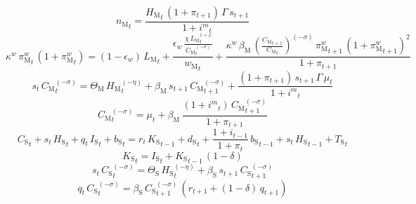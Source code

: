 \begin{dmath}
{n_\mathrm{M}}_{t}=\frac{{H_\mathrm{M}}_{t}\, \left(1+{\pi}_{t+1}\right)\, {\Gamma}\, {s}_{t+1}}{1+{i^m}_{t}}
\end{dmath}
\begin{dmath}
{\kappa^w}\, {\pi^w_\mathrm{M}}_{t}\, \left(1+{\pi^w_\mathrm{M}}_{t}\right)=\left(1-{\epsilon_w}\right)\, {L_\mathrm{M}}_{t}+\frac{{\epsilon_w}\, \frac{{\chi}\, {L_\mathrm{M}}_{t}^{1+{\varphi}}}{{C_\mathrm{M}}_{t}^{\left(-{\sigma}\right)}}}{{w_\mathrm{M}}_{t}}+\frac{{\kappa^w}\, {\beta_\mathrm{M}}\, \left(\frac{{C_\mathrm{M}}_{t+1}}{{C_\mathrm{M}}_{t}}\right)^{\left(-{\sigma}\right)}\, {\pi^w_\mathrm{M}}_{t+1}\, \left(1+{\pi^w_\mathrm{M}}_{t+1}\right)^{2}}{1+{\pi}_{t+1}}
\end{dmath}
\begin{dmath}
{s}_{t}\, {C_\mathrm{M}}_{t}^{\left(-{\sigma}\right)}={\Theta_\mathrm{M}}\, {H_\mathrm{M}}_{t}^{\left(-{\eta}\right)}+{\beta_\mathrm{M}}\, {s}_{t+1}\, {C_\mathrm{M}}_{t+1}^{\left(-{\sigma}\right)}+\frac{\left(1+{\pi}_{t+1}\right)\, {s}_{t+1}\, {\Gamma}\, {\mu}_{t}}{1+{i^m}_{t}}
\end{dmath}
\begin{dmath}
{C_\mathrm{M}}_{t}^{\left(-{\sigma}\right)}={\mu}_{t}+{\beta_\mathrm{M}}\, \frac{\left(1+{i^m}_{t}\right)\, {C_\mathrm{M}}_{t+1}^{\left(-{\sigma}\right)}}{1+{\pi}_{t+1}}
\end{dmath}
\begin{dmath}
{C_\mathrm{S}}_{t}+{s}_{t}\, {H_\mathrm{S}}_{t}+{q}_{t}\, {I_\mathrm{S}}_{t}+{b_\mathrm{S}}_{t}={r}_{t}\, {K_\mathrm{S}}_{t-1}+{d_\mathrm{S}}_{t}+\frac{1+{i}_{t-1}}{1+{\pi}_{t}}\, {b_\mathrm{S}}_{t-1}+{s}_{t}\, {H_\mathrm{S}}_{t-1}+{T_\mathrm{S}}_{t}
\end{dmath}
\begin{dmath}
{K_\mathrm{S}}_{t}={I_\mathrm{S}}_{t}+{K_\mathrm{S}}_{t-1}\, \left(1-{\delta}\right)
\end{dmath}
\begin{dmath}
{s}_{t}\, {C_\mathrm{S}}_{t}^{\left(-{\sigma}\right)}={\Theta_\mathrm{S}}\, {H_\mathrm{S}}_{t}^{\left(-{\eta}\right)}+{\beta_\mathrm{S}}\, {s}_{t+1}\, {C_\mathrm{S}}_{t+1}^{\left(-{\sigma}\right)}
\end{dmath}
\begin{dmath}
{q}_{t}\, {C_\mathrm{S}}_{t}^{\left(-{\sigma}\right)}={\beta_\mathrm{S}}\, {C_\mathrm{S}}_{t+1}^{\left(-{\sigma}\right)}\, \left({r}_{t+1}+\left(1-{\delta}\right)\, {q}_{t+1}\right)
\end{dmath}
